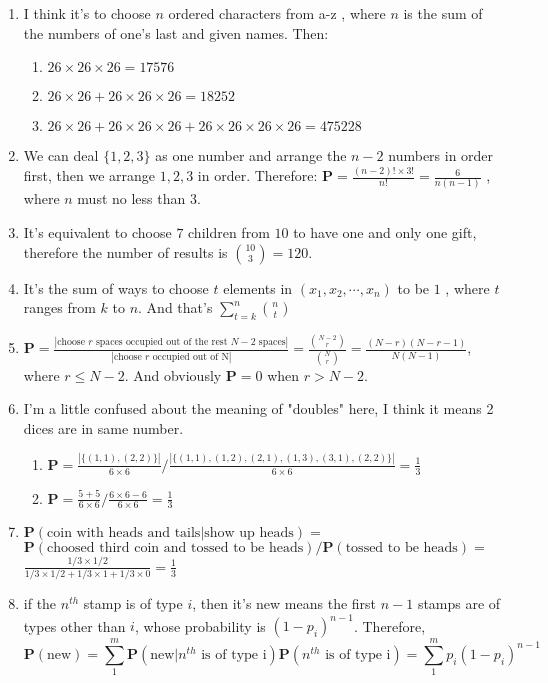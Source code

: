\documentclass[12pt]{article}
\begin{document}
\begin{enumerate}
\begin{enumerate}
    \end{enumerate}
    \item I think it's to choose $n$ ordered characters from a-z , where $n$ is the sum of the numbers of one's last and given names. Then:
    \begin{enumerate}
        \item $26 \times 26 \times 26 = 17576$
        \item $26 \times 26 + 26 \times 26 \times 26 = 18252$
        \item $26 \times 26 + 26 \times 26 \times 26 + 26 \times 26 \times 26 \times 26 = 475228$
    \end{enumerate}
    \item 
    We can deal $\{1,2,3\}$ as one number and arrange the $n-2$ numbers in order first, then we arrange ${1,2,3}$ in order. Therefore:
    $\textbf{P} = \frac{ ( n - 2 ) ! \times 3 ! }{ n ! } = \frac{6}{n ( n - 1 )}$ , where $n$ must no less than $3$. 
    \item 
    It's equivalent to choose $7$ children from $10$ to have one and only one gift, therefore the number of results is $\binom{10}{3} = 120$.
    \item 
    It's the sum of ways to choose $t$ elements in $(x_1,x_2,\cdots,x_n)$ to be $1$ , where $t$ ranges from $k$ to $n$. And that's $\sum_{t=k}^{n} \binom{n}{t}$
    \item 
    $\textbf{P} = \frac{|\text{choose $r$ spaces occupied out of the rest $N-2$ spaces}|}{|\text{choose $r$ occupied out of N}|} = \frac{\binom{N - 2}{r}}{\binom{N}{r}} = \frac{(N - r) (N - r - 1)}{N (N - 1)}$,
    where $r \le N-2$. And obviously $\textbf{P} = 0$ when $r > N-2$.
    \item I'm a little confused about the meaning of "doubles" here, I think it means 2 dices are in same number.
    \begin{enumerate}
        \item $\textbf{P} = \frac{|\{(1,1),(2,2)\}|}{6 \times 6} / \frac{|\{(1,1),(1,2),(2,1),(1,3),(3,1),(2,2)\}|}{6 \times 6} = \frac{1}{3}$
        \item $\textbf{P} = \frac{5 + 5}{6 \times 6} / \frac{6 \times 6 - 6}{6 \times 6} = \frac{1}{3}$
    \end{enumerate}
    \item 
    $\textbf{P}(\text{coin with heads and tails} | \text{show up heads}) = $\\
    $\textbf{P}(\text{choosed third coin and tossed to be heads}) / \textbf{P}(\text{tossed to be heads}) = $\\
    $\frac{1/3 \times 1/2}{1/3 \times 1/2 + 1/3 \times 1 + 1/3 \times 0} = \frac{1}{3}$
    \item 
    if the $n^{th}$ stamp is of type $i$, then it's new means the first $n - 1$ stamps are of types other than $i$, whose probability is $(1 - p_i)^{n-1}$. Therefore, 
    $$\textbf{P}(\text{new}) = \sum_1^m \textbf{P}(\text{new} | \text{$n^{th}$ is of type i}) \textbf{P}(\text{$n^{th}$ is of type i}) = \sum_1^m p_i (1-p_i)^{n-1}$$
\end{enumerate}
\end{document}
